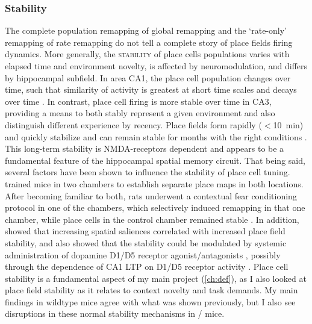 \subsubsection{Stability}
\label{sec:intro:memory:stability}
The complete population remapping of global remapping and the `rate-only' remapping of rate remapping do not tell a complete story of place fields firing dynamics.
More generally, the \textsc{stability} of place cells populations varies with elapsed time and environment novelty, is affected by neuromodulation, and differs by hippocampal subfield.
In area CA1, the place cell population changes over time, such that similarity of activity is greatest at short time scales and decays over time \citep{Mankin2012}.
In contrast, place cell firing is more stable over time in CA3, providing a means to both stably represent a given environment and also distinguish different experience by recency.
Place fields form rapidly ($<$10~min) and quickly stabilize \citep{Frank2004} and can remain stable for months with the right conditions \citep{Thompson1990}\citep{Lever2002a}\citep{Ziv2013}.
This long-term stability is NMDA-receptors dependent \citep{Kentros1998} and appears to be a fundamental feature of the hippocampal spatial memory circuit.
That being said, several factors have been shown to influence the stability of place cell tuning.
\citeauthor{Moita2004} trained mice in two chambers to establish separate place maps in both locations.
After becoming familiar to both, rats underwent a contextual fear conditioning protocol in one of the chambers, which selectively induced remapping in that one chamber, while place cells in the control chamber remained stable \citep{Moita2004}.
In addition, \citeauthor{Kentros2004} showed that increasing spatial saliences correlated with increased place field stability, and also showed that the stability could be modulated by systemic administration of dopamine D1/D5 receptor agonist/antagonists \citep{Kentros2004}, possibly through the dependence of CA1 LTP on D1/D5 receptor activity \citep{Kentros1998}.
Place cell stability is a fundamental aspect of my main project (\autoref{ch:def}), as I also looked at place field stability as it relates to context novelty and task demands.
My main findings in wildtype mice agree with what was shown previously, but I also see disruptions in these normal stability mechanisms in \df/ mice.

